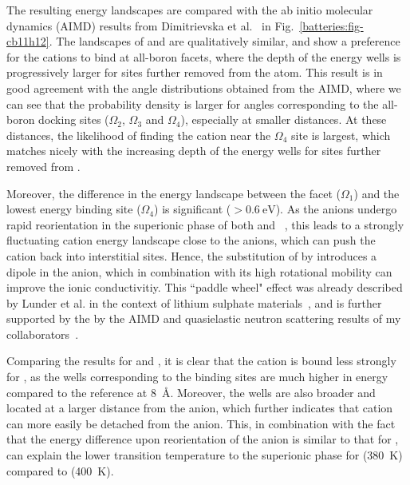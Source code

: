 \begin{refsection}
The resulting energy landscapes are compared with the ab initio molecular dynamics (AIMD) results from Dimitrievska et al.~\cite{Dimitrievska2018} in Fig.~\ref{batteries:fig-cb11h12}. The landscapes of  and  are qualitatively similar, and show a preference for the cations to bind at all-boron facets, where the depth of the energy wells is progressively larger for sites further removed from the  atom. This result is in good agreement with the angle distributions obtained from the AIMD, where we can see that the probability density is larger for angles corresponding to the all-boron docking sites ($\Omega_2$, $\Omega_3$ and $\Omega_4$), especially at smaller distances. At these distances, the likelihood of finding the cation near the $\Omega_4$ site is largest, which matches nicely with the increasing depth of the energy wells for sites further removed from . 

Moreover, the difference in the energy landscape between the  facet ($\Omega_1$) and the lowest energy binding site ($\Omega_4$) is significant ($>0.6~\si{\electronvolt}$). As the anions undergo rapid reorientation in the superionic phase of both  and ~\cite{Dimitrievska2018}, this leads to a strongly fluctuating cation energy landscape close to the anions, which can push the cation back into interstitial sites. Hence, the substitution of  by  introduces a dipole in the anion, which in combination with its high rotational mobility can improve the ionic conductivitiy. This ``paddle wheel" effect was already described by Lunder et al. in the context of lithium sulphate materials~\cite{Lunden1995}, and is further supported by the by the AIMD and quasielastic neutron scattering results of my collaborators~\cite{Dimitrievska2018}. 

Comparing the results for  and , it is clear that the cation is bound less strongly for , as the wells corresponding to the binding sites are much higher in energy compared to the reference at 8~\si{\angstrom}. Moreover, the wells are also broader and located at a larger distance from the anion, which further indicates that cation can more easily be detached from the anion. This, in combination with the fact that the energy difference upon reorientation of the anion is similar to that for , can explain the lower transition temperature to the superionic phase for  (380~\si{\kelvin}) compared to  (400~\si{\kelvin}).

\pagebreak[4]

\end{refsection}
